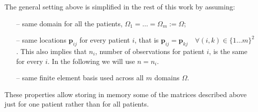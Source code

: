 The general setting above is simplified in the rest of this work by assuming:
\begin{itemize}
	\item[--] same domain for all the patients, \ie $\Omega_1 = \ldots = \Omega_m:=
			\Omega$; \item[--] same locations $\bm{p}_{ij}$ for every patient $i$, that is
		$\bm{p}_{ij}=\bm{p}_{kj} \quad \forall (i,k) \in \{ 1 \ldots m \}^2$. This also
		implies that $n_i$, number of observations for patient $i$, is the same for
		every $i$. In the following we will use $n=n_i$. \item[--] same finite element
		basis used across all $m$ domains $\Omega$.
\end{itemize}
These properties allow storing in memory some of the matrices
described above just for one patient rather than for all patients.
